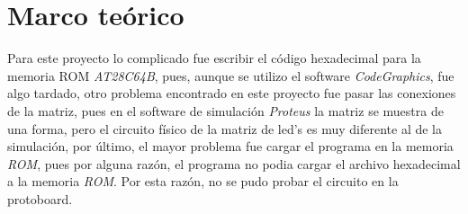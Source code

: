 \documentclass[12pt, oneside]{article}
\begin{document}
\section{Marco teórico}
{\sffamily\large
    \hspace{0.5cm} Para este proyecto lo complicado fue escribir el código hexadecimal para la
    memoria ROM \emph{AT28C64B}, pues, aunque se utilizo el software \emph{CodeGraphics}, fue algo
    tardado, otro problema encontrado en este proyecto fue pasar las conexiones de la matriz, pues
    en el software de simulación \emph{Proteus\textregistered} la matriz se muestra de una forma,
    pero el circuito físico de la matriz de led's es muy diferente al de la simulación, por
    último, el mayor problema fue cargar el programa en la memoria \emph{ROM}, pues por alguna
    razón, el programa no podia cargar el archivo hexadecimal a la memoria \emph{ROM}. Por esta
    razón, no se pudo probar el circuito en la protoboard.

}

\newpage
\end{document}

